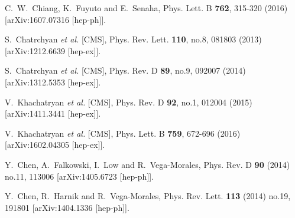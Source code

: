 \documentclass[pdftex,twocolumn,epjc3]{svjour3}          %
\begin{document}
\begin{thebibliography}{9}
C.~W.~Chiang, K.~Fuyuto and E.~Senaha,
Phys. Lett. B \textbf{762}, 315-320 (2016)
[arXiv:1607.07316 [hep-ph]].


S.~Chatrchyan \textit{et al.} [CMS],
Phys. Rev. Lett. \textbf{110}, no.8, 081803 (2013)
[arXiv:1212.6639 [hep-ex]].

S.~Chatrchyan \textit{et al.} [CMS],
Phys. Rev. D \textbf{89}, no.9, 092007 (2014)
[arXiv:1312.5353 [hep-ex]].

V.~Khachatryan \textit{et al.} [CMS],
Phys. Rev. D \textbf{92}, no.1, 012004 (2015)
[arXiv:1411.3441 [hep-ex]].

V.~Khachatryan \textit{et al.} [CMS],
Phys. Lett. B \textbf{759}, 672-696 (2016)
[arXiv:1602.04305 [hep-ex]].

Y.~Chen, A.~Falkowski, I.~Low and R.~Vega-Morales,
Phys. Rev. D \textbf{90} (2014) no.11, 113006
[arXiv:1405.6723 [hep-ph]].

Y.~Chen, R.~Harnik and R.~Vega-Morales,
Phys. Rev. Lett. \textbf{113} (2014) no.19, 191801
[arXiv:1404.1336 [hep-ph]].


\end{thebibliography}
\end{document}
